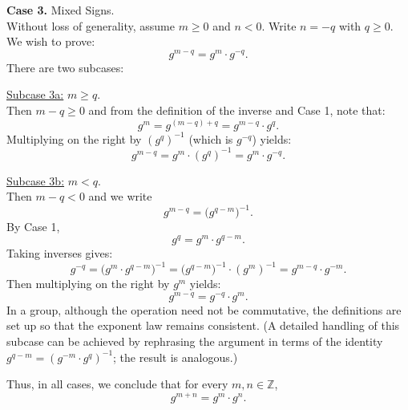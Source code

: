 \documentclass[11pt,openany]{article}
\begin{document}
\begin{remark*}
\textbf{Case 3.} Mixed Signs.\\
Without loss of generality, assume \(m \ge 0\) and \(n < 0\). Write \(n = -q\) with \(q \ge 0\). We wish to prove:
\[
g^{m - q} = g^m \cdot g^{-q}.
\]
There are two subcases:

\underline{Subcase 3a:} \(m \ge q\).\\
Then \(m - q \ge 0\) and from the definition of the inverse and Case 1, note that:
\[
g^m = g^{(m - q) + q} = g^{m-q} \cdot g^q.
\]
Multiplying on the right by \((g^q)^{-1}\) (which is \(g^{-q}\)) yields:
\[
g^{m-q} = g^m \cdot (g^q)^{-1} = g^m \cdot g^{-q}.
\]

\underline{Subcase 3b:} \(m < q\).\\
Then \(m - q < 0\) and we write
\[
g^{m-q} = \bigl( g^{q-m} \bigr)^{-1}.
\]
By Case 1,
\[
g^q = g^m \cdot g^{q-m}.
\]
Taking inverses gives:
\[
g^{-q} = \bigl( g^m \cdot g^{q-m} \bigr)^{-1} = \bigl( g^{q-m} \bigr)^{-1} \cdot (g^m)^{-1} = g^{m-q} \cdot g^{-m}.
\]
Then multiplying on the right by \(g^m\) yields:
\[
g^{m-q} = g^{-q} \cdot g^m.
\]
In a group, although the operation need not be commutative, the definitions are set up so that the exponent law remains consistent. (A detailed handling of this subcase can be achieved by rephrasing the argument in terms of the identity \(g^{q-m} = (g^{-m} \cdot g^q)^{-1}\); the result is analogous.)

Thus, in all cases, we conclude that for every \(m,n \in \mathbb{Z}\),
\[
g^{m+n} = g^m \cdot g^n.
\]
\end{remark*}
\end{document}

